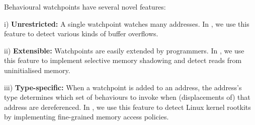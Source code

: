 \documentclass[letterpaper,twocolumn,10pt]{article}
\newenvironment{enumerate*}%
  {\begin{enumerate}%
    \setlength{\itemsep}{2pt}%
    \setlength{\parskip}{0pt}}%
  {\end{enumerate}}
\begin{document}
\noindent
Behavioural watchpoints have several novel features:
\begin{enumerate*}
	\item[i)] {\bf Unrestricted:} A single watchpoint watches many addresses. In , we use this feature to detect various kinds of buffer overflows.
	\item[ii)] {\bf Extensible:} Watchpoints are easily extended by programmers. In , we use this feature to implement selective memory shadowing and detect reads from uninitialised memory.
	\item[iii)] {\bf Type-specific:} When a watchpoint is added to an address, the address's type determines which set of behaviours to invoke when (displacements of) that address are dereferenced. In , we use this feature to detect Linux kernel rootkits by implementing fine-grained memory access policies.
\end{enumerate*}









\end{document}
